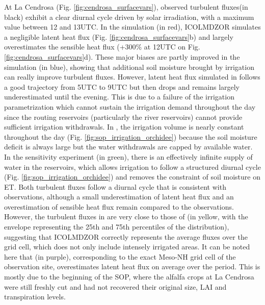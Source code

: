 At La Cendrosa (Fig. \ref{fig:cendrosa_surfacevars}), observed turbulent fluxes(in black) exhibit a clear diurnal cycle driven by solar irradiation, with a maximum value between 12 and 13UTC.
In the \noirr simulation (in red), ICOLMDZOR simulates a negligible latent heat flux (Fig. \ref{fig:cendrosa_surfacevars}b) and largely overestimates the sensible heat flux (+300\% at 12UTC on Fig. \ref{fig:cendrosa_surfacevars}d). 
These major biases are partly improved in the \irr simulation (in blue), showing that additional soil moisture brought by irrigation can really improve turbulent fluxes. However, latent heat flux simulated in \irr follows a good trajectory from 5UTC to 9UTC but then drops and remains largely underestimated until the evening. This is due to a failure of the irrigation parametrization which cannot sustain the irrigation demand throughout the day since the routing reservoirs (particularly the river reservoirs) cannot provide sufficient irrigation withdrawals. In \irr, the irrigation volume is nearly constant throughout the day (Fig. \ref{fig:sop_irrigation_orchidee}) because the soil moisture deficit is always large but the water withdrawals are capped by available water.
In the \irrboost sensitivity experiment (in green), there is an effectively infinite supply of water in the reservoirs, which allows irrigation to follow a structured diurnal cycle (Fig. \ref{fig:sop_irrigation_orchidee}) and removes the constraint of soil moisture on ET. Both turbulent fluxes follow a diurnal cycle that is consistent with observations, although a small underestimation of latent heat flux and an overestimation of sensible heat flux remain compared to the observations. 
However, the turbulent fluxes in \irrboost are very close to those of \mesomean (in yellow, with the envelope representing the 25th and 75th percentiles of the distribution), suggesting that ICOLMDZOR correctly represents the average fluxes over the grid cell, which does not only include intensely irrigated areas.
It can be noted here that \mesoexact (in purple), corresponding to the exact Meso-NH grid cell of the observation site, overestimates latent heat flux on average over the period. This is mostly due to the beginning of the SOP, where the alfalfa crops at La Cendrosa were still freshly cut and had not recovered their original size, LAI and transpiration levels.

